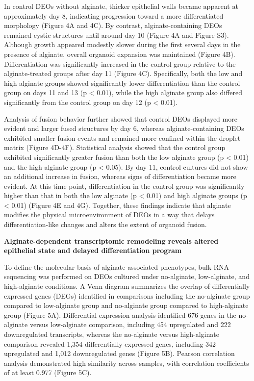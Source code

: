 \documentclass[
]{article}
\begin{document}
In control DEOs without alginate, thicker epithelial walls became apparent at approximately day 8, indicating progression toward a more differentiated morphology (Figure 4A and 4C). By contrast, alginate-containing DEOs remained cystic structures until around day 10 (Figure 4A and Figure S3). Although growth appeared modestly slower during the first several days in the presence of alginate, overall organoid expansion was maintained (Figure 4B). Differentiation was significantly increased in the control group relative to the alginate-treated groups after day 11 (Figure 4C). Specifically, both the low and high alginate groups showed significantly lower differentiation than the control group on days 11 and 13 (p \textless{} 0.01), while the high alginate group also differed significantly from the control group on day 12 (p \textless{} 0.01).

Analysis of fusion behavior further showed that control DEOs displayed more evident and larger fused structures by day 6, whereas alginate-containing DEOs exhibited smaller fusion events and remained more confined within the droplet matrix (Figure 4D-4F). Statistical analysis showed that the control group exhibited significantly greater fusion than both the low alginate group (p \textless{} 0.01) and the high alginate group (p \textless{} 0.05). By day 11, control cultures did not show an additional increase in fusion, whereas signs of differentiation became more evident. At this time point, differentiation in the control group was significantly higher than that in both the low alginate (p \textless{} 0.01) and high alginate groups (p \textless{} 0.01) (Figure 4E and 4G). Together, these findings indicate that alginate modifies the physical microenvironment of DEOs in a way that delays differentiation-like changes and alters the extent of organoid fusion.

\textbf{Alginate-dependent transcriptomic remodeling reveals altered epithelial state and delayed differentiation program}

To define the molecular basis of alginate-associated phenotypes, bulk RNA sequencing was performed on DEOs cultured under no-alginate, low-alginate, and high-alginate conditions. A Venn diagram summarizes the overlap of differentially expressed genes (DEGs) identified in comparisons including the no-alginate group compared to low-alginate group and no-alginate group compared to high-alginate group (Figure 5A). Differential expression analysis identified 676 genes in the no-alginate versus low-alginate comparison, including 454 upregulated and 222 downregulated transcripts, whereas the no-alginate versus high-alginate comparison revealed 1,354 differentially expressed genes, including 342 upregulated and 1,012 downregulated genes (Figure 5B). Pearson correlation analysis demonstrated high similarity across samples, with correlation coefficients of at least 0.977 (Figure 5C).
\end{document}
